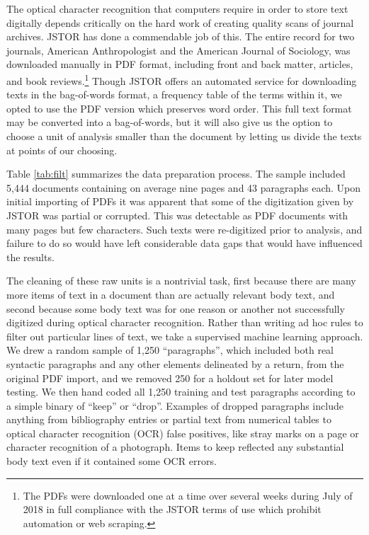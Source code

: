 \documentclass[]{book}
\let\rmarkdownfootnote\footnote%
\def\footnote{\protect\rmarkdownfootnote}
\theoremstyle{definition}
\theoremstyle{definition}
\theoremstyle{definition}
\theoremstyle{remark}
\begin{document}
The optical character recognition that computers require in order to
store text digitally depends critically on the hard work of creating
quality scans of journal archives. JSTOR has done a commendable job of
this. The entire record for two journals, American Anthropologist and
the American Journal of Sociology, was downloaded manually in PDF
format, including front and back matter, articles, and book
reviews.\footnote{The PDFs were downloaded one at a time over several
  weeks during July of 2018 in full compliance with the JSTOR terms of
  use which prohibit automation or web scraping.} Though JSTOR offers an
automated service for downloading texts in the bag-of-words format, a
frequency table of the terms within it, we opted to use the PDF version
which preserves word order. This full text format may be converted into
a bag-of-words, but it will also give us the option to choose a unit of
analysis smaller than the document by letting us divide the texts at
points of our choosing.

Table \ref{tab:filt} summarizes the data preparation process. The sample
included 5,444 documents containing on average nine pages and 43
paragraphs each. Upon initial importing of PDFs it was apparent that
some of the digitization given by JSTOR was partial or corrupted. This
was detectable as PDF documents with many pages but few characters. Such
texts were re-digitized prior to analysis, and failure to do so would
have left considerable data gaps that would have influenced the results.

The cleaning of these raw units is a nontrivial task, first because
there are many more items of text in a document than are actually
relevant body text, and second because some body text was for one reason
or another not successfully digitized during optical character
recognition. Rather than writing ad hoc rules to filter out particular
lines of text, we take a supervised machine learning approach. We drew a
random sample of 1,250 ``paragraphs'', which included both real
syntactic paragraphs and any other elements delineated by a return, from
the original PDF import, and we removed 250 for a holdout set for later
model testing. We then hand coded all 1,250 training and test paragraphs
according to a simple binary of ``keep'' or ``drop''. Examples of
dropped paragraphs include anything from bibliography entries or partial
text from numerical tables to optical character recognition (OCR) false
positives, like stray marks on a page or character recognition of a
photograph. Items to keep reflected any substantial body text even if it
contained some OCR errors.
\end{document}
